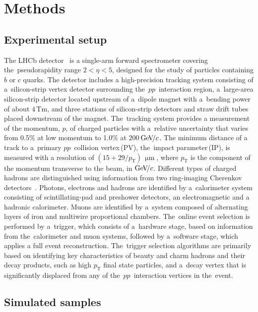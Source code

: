 \documentclass[12pt,a4paper]{article}
\def\lhcb   {\mbox{LHCb}\xspace}
\def\Pb      {\ensuremath{\mathrm{b}}\xspace}
\def\Pc      {\ensuremath{\mathrm{c}}\xspace}
\def\Pp      {\ensuremath{\mathrm{p}}\xspace}
\def\Pb      {\ensuremath{b}\xspace}
\def\Pc      {\ensuremath{c}\xspace}
\def\Pp      {\ensuremath{p}\xspace}
\def\cquark    {{\ensuremath{\Pc}}\xspace}
\def\bquark    {{\ensuremath{\Pb}}\xspace}
\def\proton      {{\ensuremath{\Pp}}\xspace}
\newcommand{\nospaceunit}[1]{\ensuremath{\text{#1}}}
\newcommand{\aunit}[1]{\ensuremath{\text{\,#1}}}
\newcommand{\gevc}{\ensuremath{\aunit{Ge\kern -0.1em V\!/}c}\xspace}
\def\mum  {\ensuremath{\,\upmu\nospaceunit{m}}\xspace}
\def\pt         {\ensuremath{p_{\mathrm{T}}}\xspace}
\def\ptot       {\ensuremath{p}\xspace}
\begin{document}
\clearpage
\section*{Methods}

\subsection*{Experimental setup} 



The \lhcb detector~\cite{LHCb-DP-2008-001,LHCb-DP-2014-002} is a single-arm forward
spectrometer covering the~pseudorapidity range $2<\eta <5$,
designed for the study of particles containing \bquark or \cquark
quarks. The detector includes a high-precision tracking system
consisting of a~silicon\nobreakdash-strip vertex detector surrounding 
the~$\proton\proton$~interaction region,
a~large-area silicon-strip detector located
upstream of a~dipole magnet with a~bending power of about
$4{\mathrm{\,Tm}}$, and three stations of silicon\nobreakdash-strip detectors and straw
drift tubes
placed downstream of the magnet.
The~tracking system provides a measurement of the momentum, \ptot, 
of charged particles with
a~relative uncertainty that varies from 0.5\% at low momentum to 1.0\% at 200\gevc.
The minimum distance of a track to 
a~primary $\proton\proton$~collision vertex\,(PV), 
the~impact parameter\,(IP), 
is measured with a resolution of $(15+29/\pt)\mum$,
where \pt is the component of the momentum transverse to the beam, in\,\gevc.
Different types of charged hadrons are distinguished using information
from two ring-imaging Cherenkov detectors~\cite{LHCb-DP-2012-003}. 
Photons, electrons and hadrons are identified by 
a~calorimeter system consisting of
scintillating-pad and preshower detectors, an electromagnetic
and a hadronic calorimeter. 
Muons are identified by a~system composed of 
alternating layers of iron and multiwire
proportional chambers.
The~online event selection is performed by 
a~trigger, 
which consists of a~hardware stage, based on information from 
the~calorimeter and muon systems, 
followed by a~software stage, which applies a full event
reconstruction.
The~trigger selection algorithms are primarily 
based on identifying key characteristics 
of 
beauty and charm hadrons
and their decay products, 
such as high \pt final state particles, 
and a~decay vertex that is significantly displaced 
from any of the~$\proton\proton$~interaction 
vertices in the~event.

\subsection*{Simulated samples} 
\end{document}
